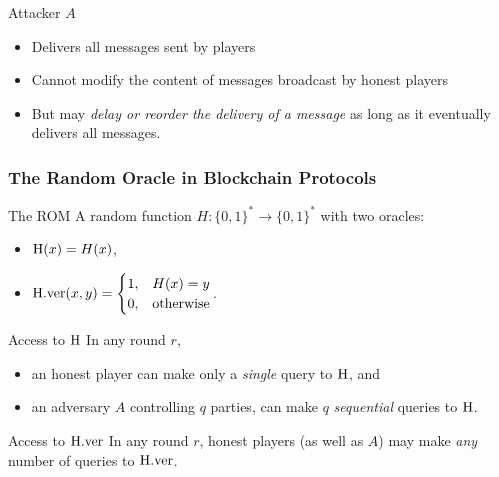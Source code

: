 \documentclass{beamer}
\begin{document}
\begin{spacing}{1.2}
\begin{frame}
	\begin{block}{Attacker $A$}
		\begin{itemize}
			\item Delivers all messages sent by players
			\item Cannot modify the content of messages broadcast by honest players
			\item But may \textit{delay or reorder the delivery of a message} as long as it eventually delivers all messages.
		\end{itemize}
	\end{block}
\end{frame}

\begin{frame}
	\frametitle{The Random Oracle in Blockchain Protocols}
	\vspace{-5pt}
	\begin{block}{The ROM}
		A random function $H : \{0, 1\}^* \rightarrow \{0, 1\}^*$ with two oracles:
		\begin{itemize}
			\item ${\rm H}(x) = H(x)$,
			\item ${\rm H.ver}(x,y)	 =
				\begin{cases}
					1, & H(x) = y\\
					0, & {\rm otherwise}
				\end{cases}$.
	   \end{itemize}
	\end{block}
	\vspace{10pt}
	\begin{block}{Access to ${\rm H}$}
		In any round $r$,
		\begin{itemize}
			\item an honest player can make only a \textit{single} query to ${\rm H}$, and
			\item an adversary $A$ controlling $q$ parties, can make $q$ \textit{sequential} queries to ${\rm H}$.
		\end{itemize}
	\end{block}
	\vspace{10pt}
	\begin{block}{Access to ${\rm H.ver}$}
		In any round $r$, honest players (as well as $A$) may make \textit{any} number of queries to ${\rm H.ver}$.
	\end{block}
\end{frame}


\end{spacing}
\end{document}
